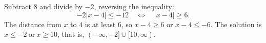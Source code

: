 Subtract $8$ and divide by $-2$, reversing the inequality:
\[
-2|x-4|\le-12\quad\Longleftrightarrow\quad|x-4|\ge6 .
\]
The distance from $x$ to $4$ is at least $6$, so $x-4\ge6$ or $x-4\le-6$. The solution is $\boxed{x\le-2\ \text{or}\ x\ge10}$, that is, $(-\infty,-2]\cup[10,\infty)$.
